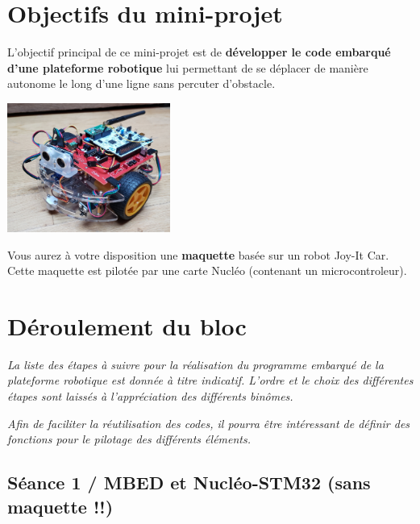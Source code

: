 \documentclass[a4paper,11pt,titlepage]{article} %
\begin{document}
\section{Objectifs du mini-projet}

L'objectif principal de ce mini-projet est de \textbf{développer le code embarqué d'une plateforme robotique} lui permettant de se déplacer de manière autonome le long d'une ligne sans percuter d'obstacle.

\begin{center}
	\includegraphics[width=0.4\textwidth]{images/robot_joycar.jpg}
\end{center}


\medskip

Vous aurez à votre disposition une \textbf{maquette} basée sur un robot Joy-It Car. Cette maquette est pilotée par une carte Nucléo (contenant un microcontroleur).


\newpage

\section{Déroulement du bloc}

\textit{La liste des étapes à suivre pour la réalisation du programme embarqué de la plateforme robotique est donnée à titre indicatif. L'ordre et le choix des différentes étapes sont laissés à l'appréciation des différents binômes.}

\textit{Afin de faciliter la réutilisation des codes, il pourra être intéressant de définir des fonctions pour le pilotage des différents éléments.}

\subsection{Séance 1 / MBED et Nucléo-STM32 (sans maquette !!)}
\end{document}
